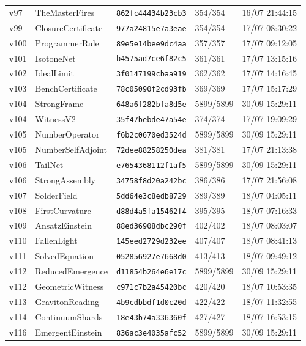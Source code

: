 \documentclass[11pt]{article}
\theoremstyle{definition}\newtheorem{deriv}{Derivation}
\begin{document}
{\begin{longtable}{@{}lllll@{}}
v97 & TheMasterFires & \texttt{862fc44434b23cb3} & 354/354 & 16/07 21:44:15 \\
v99 & ClosureCertificate & \texttt{977a24815e7a3eae} & 354/354 & 17/07 08:30:22 \\
v100 & ProgrammerRule & \texttt{89e5e14bee9dc4aa} & 357/357 & 17/07 09:12:05 \\
v101 & IsotoneNet & \texttt{b4575ad7ce6f82c5} & 361/361 & 17/07 13:15:16 \\
v102 & IdealLimit & \texttt{3f0147199cbaa919} & 362/362 & 17/07 14:16:45 \\
v103 & BenchCertificate & \texttt{78c05090f2cd93fb} & 369/369 & 17/07 15:17:29 \\
v104 & StrongFrame & \texttt{648a6f282bfa8d5e} & 5899/5899 & 30/09 15:29:11 \\
v104 & WitnessV2 & \texttt{35f47bebde47a54e} & 374/374 & 17/07 19:09:29 \\
v105 & NumberOperator & \texttt{f6b2c0670ed3524d} & 5899/5899 & 30/09 15:29:11 \\
v105 & NumberSelfAdjoint & \texttt{72dee88258250dea} & 381/381 & 17/07 21:13:38 \\
v106 & TailNet & \texttt{e7654368112f1af5} & 5899/5899 & 30/09 15:29:11 \\
v106 & StrongAssembly & \texttt{34758f8d20a242bc} & 386/386 & 17/07 21:56:08 \\
v107 & SolderField & \texttt{5dd64e3c8edb8729} & 389/389 & 18/07 04:05:11 \\
v108 & FirstCurvature & \texttt{d88d4a5fa15462f4} & 395/395 & 18/07 07:16:33 \\
v109 & AnsatzEinstein & \texttt{88ed36908dbc290f} & 402/402 & 18/07 08:03:07 \\
v110 & FallenLight & \texttt{145eed2729d232ee} & 407/407 & 18/07 08:41:13 \\
v111 & SolvedEquation & \texttt{052856927e7668d0} & 413/413 & 18/07 09:49:12 \\
v112 & ReducedEmergence & \texttt{d11854b264e6e17c} & 5899/5899 & 30/09 15:29:11 \\
v112 & GeometricWitness & \texttt{c971c7b2a45420bc} & 420/420 & 18/07 10:53:35 \\
v113 & GravitonReading & \texttt{4b9cdbbdf1d0c20d} & 422/422 & 18/07 11:32:55 \\
v114 & ContinuumShards & \texttt{18e43b74a336360f} & 427/427 & 18/07 16:53:15 \\
v116 & EmergentEinstein & \texttt{836ac3e4035afc52} & 5899/5899 & 30/09 15:29:11 \\

\end{longtable}}
\end{document}
